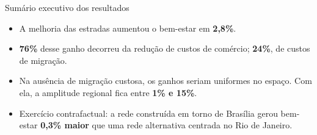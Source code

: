 \begin{frame}{Sumário executivo dos resultados}
    \begin{itemize}
        \item A melhoria das estradas aumentou o bem-estar em \textbf{2,8\%}.
        \item \textbf{76\%} desse ganho decorreu da redução de custos de comércio; \textbf{24\%}, de custos de migração.
        \item Na ausência de migração custosa, os ganhos seriam uniformes no espaço. Com ela, a amplitude regional fica entre \textbf{1\% e 15\%}.
        \item Exercício contrafactual: a rede construída em torno de Brasília gerou bem-estar \textbf{0,3\% maior} que uma rede alternativa centrada no Rio de Janeiro.
    \end{itemize}
\end{frame}
